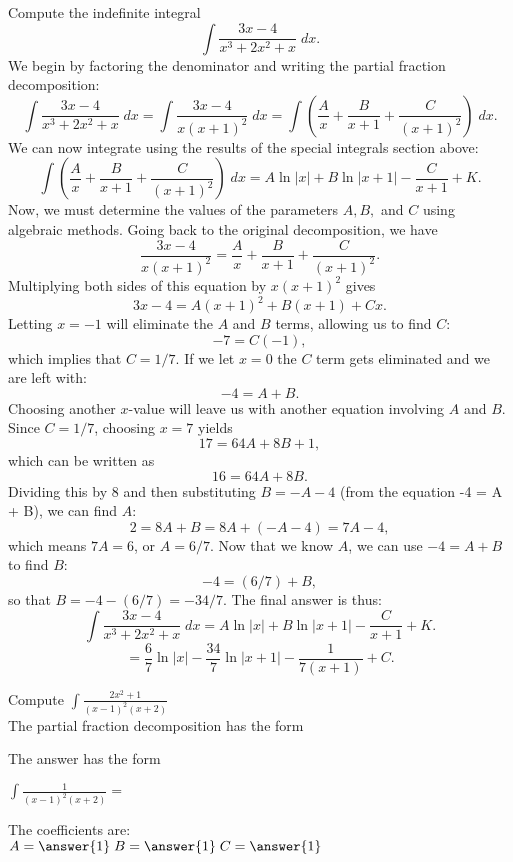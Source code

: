 \documentclass{ximera}
\begin{document}
\begin{example}
Compute the indefinite integral
\[
\int \frac{3x - 4}{x^3 + 2x^2 + x} \; dx.
\]
We begin by factoring the denominator and writing the partial fraction decomposition:
\[
\int \frac{3x - 4}{x^3 + 2x^2 + x} \; dx = \int \frac{3x - 4}{x(x+1)^2} \; dx = \int \left(\frac{A}{x} + \frac{B}{x+1} + \frac{C}{(x+1)^2} \right) \; dx.
\]
We can now integrate using the results of the special integrals section above:
\[
\int \left(\frac{A}{x} + \frac{B}{x+1} + \frac{C}{(x+1)^2} \right) \; dx = A\ln|x| + B\ln|x+1| - \frac{C}{x+1} + K.
\]
Now, we must determine the values of the parameters $A, B, $ and $C$ using algebraic methods.
Going back to the original decomposition, we have
\[
\frac{3x - 4}{x(x+1)^2} = \frac{A}{x} + \frac{B}{x+1} + \frac{C}{(x+1)^2}.
\]
Multiplying both sides of this equation by $x(x+1)^2$ gives
\[
3x-4 = A(x+1)^2 + B(x+1) + Cx.
\]
Letting $x = -1$ will eliminate the $A$ and $B$ terms, allowing us to find $C$:
\[
-7 = C(-1),
\]
which implies that $C = 1/7$.  If we let $x = 0$ the $C$ term gets eliminated and we are left with:
\[
-4 = A + B.
\]
Choosing another $x$-value will leave us with another equation involving $A$ and $B$.  Since $C = 1/7$, choosing $x = 7$ yields
\[
17 = 64A + 8B + 1,
\]
which can be written as 
\[
16 = 64A + 8B.
\]
Dividing this by 8 and then substituting $B = -A - 4$ (from the equation -4 = A + B), we can find $A$:
\[
2 = 8A + B = 8A + (-A-4) = 7A -4,
\]
which means $7A = 6$, or $A = 6/7$.
Now that we know $A$, we can use $-4 = A + B$ to find $B$:
\[
-4 = (6/7) + B,
\]
so that $B = -4 - (6/7) = -34/7$. The final answer is thus:
\[
\int \frac{3x - 4}{x^3 + 2x^2 + x} \; dx = A\ln|x| + B\ln|x+1| - \frac{C}{x+1} + K.
\]
\[
= \frac67\ln|x| -\frac{34}{7}\ln|x+1| - \frac{1}{7(x+1)} + C.
\]


\end{example}

\begin{problem}

Compute $\displaystyle{\int \frac{2x^2 + 1}{(x-1)^2(x+2)}}$\\

The partial fraction decomposition has the form

\begin{multipleChoice}
\end{multipleChoice}

The answer has the form

$\displaystyle{\int \frac{1}{(x-1)^2(x+2)}=}$
\begin{multipleChoice}
\end{multipleChoice}

The coefficients are:\\
$A = \answer{1} \; B = \answer{1} \; C = \answer{1}$
\end{problem}
\end{document}

